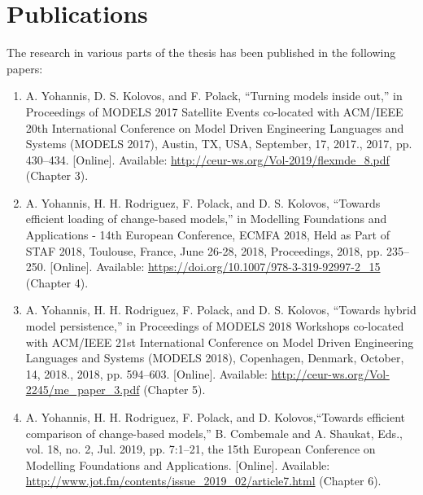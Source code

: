 \section{Publications}
\label{sec:publications}
The research in various parts of the thesis has been published in the following 
papers: 
\begin{enumerate}
  \item A. Yohannis, D. S. Kolovos, and F. Polack, ``Turning models inside out,'' in Proceedings of MODELS 2017 Satellite Events co-located with ACM/IEEE 20th International Conference on Model Driven Engineering Languages and Systems (MODELS 2017), Austin, TX, USA, September, 17, 2017., 2017, pp. 430–434. [Online]. Available: \url{http://ceur-ws.org/Vol-2019/flexmde_8.pdf} (Chapter 3).
  
  \item  A. Yohannis, H. H. Rodriguez, F. Polack, and D. S. Kolovos, ``Towards efficient loading of change-based models,'' in Modelling Foundations and Applications - 14th European Conference, ECMFA 2018, Held as Part of STAF 2018, Toulouse,  France, June 26-28, 2018, Proceedings, 2018, pp. 235–250. [Online]. Available: \url{https://doi.org/10.1007/978-3-319-92997-2_15} (Chapter 4).
  
  \item  A. Yohannis, H. H. Rodriguez, F. Polack, and D. S. Kolovos, ``Towards hybrid model persistence,'' in Proceedings of MODELS 2018 Workshops co-located with ACM/IEEE 21st International Conference on Model Driven Engineering Languages and Systems (MODELS 2018), Copenhagen, 
  Denmark, October, 14, 2018., 2018, pp. 594–603. [Online]. Available:  \url{http://ceur-ws.org/Vol-2245/me_paper_3.pdf} (Chapter 5).
  
  \item  A. Yohannis, H. H. Rodriguez, F. Polack, and D. Kolovos,``Towards efficient comparison of change-based models,'' B. Combemale and A. Shaukat, Eds., vol. 18, no. 2, Jul. 2019, pp. 7:1–21, the 15th European Conference on Modelling Foundations and Applications. [Online]. Available: 
  \url{http://www.jot.fm/contents/issue_2019_02/article7.html} (Chapter 6).
\end{enumerate}
